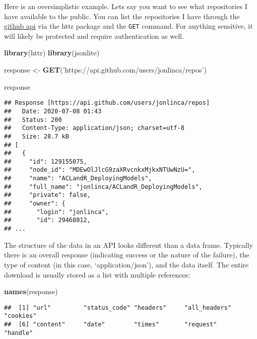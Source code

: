 \documentclass[
]{book}
\newenvironment{Shaded}{\begin{snugshade}}{\end{snugshade}}
\newcommand{\KeywordTok}[1]{\textcolor[rgb]{0.13,0.29,0.53}{\textbf{#1}}}
\newcommand{\NormalTok}[1]{#1}
\newcommand{\StringTok}[1]{\textcolor[rgb]{0.31,0.60,0.02}{#1}}
\begin{document}
Here is an oversimplistic example. Lets say you want to see what repositories I have available to the public. You can list the repositories I have through the \href{https://developer.github.com/v3/repos/\#list-repositories-for-a-user}{github api} via the httr package and the \texttt{GET} command. For anything sensitive, it will likely be protected and require authentication as well.

\begin{Shaded}
\begin{Highlighting}[]
\KeywordTok{library}\NormalTok{(httr)}
\KeywordTok{library}\NormalTok{(jsonlite)}

\NormalTok{response <-}\StringTok{ }\KeywordTok{GET}\NormalTok{(}\StringTok{'https://api.github.com/users/jonlinca/repos'}\NormalTok{)}

\NormalTok{response}
\end{Highlighting}
\end{Shaded}

\begin{verbatim}
## Response [https://api.github.com/users/jonlinca/repos]
##   Date: 2020-07-08 01:43
##   Status: 200
##   Content-Type: application/json; charset=utf-8
##   Size: 28.7 kB
## [
##   {
##     "id": 129155075,
##     "node_id": "MDEwOlJlcG9zaXRvcnkxMjkxNTUwNzU=",
##     "name": "ACLandR_DeployingModels",
##     "full_name": "jonlinca/ACLandR_DeployingModels",
##     "private": false,
##     "owner": {
##       "login": "jonlinca",
##       "id": 29468012,
## ...
\end{verbatim}

The structure of the data in an API looks different than a data frame. Typically there is an overall response (indicating success or the nature of the failure), the type of content (in this case, `application/json'), and the data itself. The entire download is usually stored as a list with multiple references:

\begin{Shaded}
\begin{Highlighting}[]
\KeywordTok{names}\NormalTok{(response)}
\end{Highlighting}
\end{Shaded}

\begin{verbatim}
##  [1] "url"         "status_code" "headers"     "all_headers" "cookies"    
##  [6] "content"     "date"        "times"       "request"     "handle"
\end{verbatim}
\end{document}
